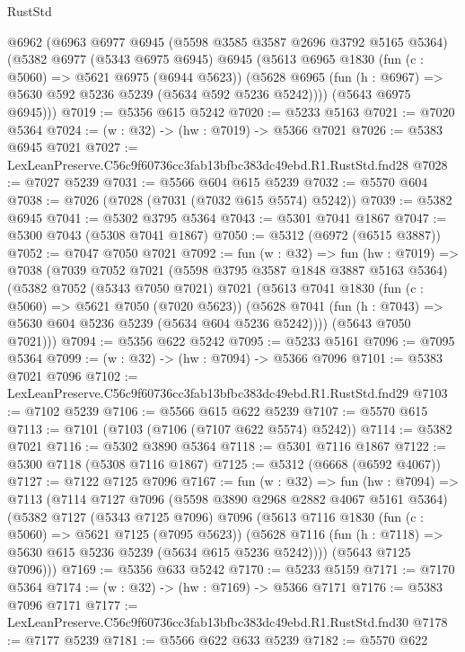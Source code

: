 \begin{lexlean}{RustStd}
\begin{coremodule}
  @6962
    (@6963
      @6977
      @6945
      (@5598 @3585 @3587 @2696 @3792 @5165 @5364)
      (@5382
        @6977
        (@5343 @6975 @6945)
        @6945
        (@5613
          @6965
          @1830
          (fun (c : @5060) => @5621 @6975 (@6944 @5623))
          (@5628 @6965 (fun (h : @6967) => @5630 @592 @5236 @5239 (@5634 @592 @5236 @5242))))
        (@5643 @6975 @6945)))
@7019 := @5356 @615 @5242
@7020 := @5233 @5163
@7021 := @7020 @5364
@7024 := (w : @32) -> (hw : @7019) -> @5366 @7021
@7026 := @5383 @6945 @7021
@7027 := LexLeanPreserve.C56c9f60736cc3fab13bfbc383dc49ebd.R1.RustStd.fnd28
@7028 := @7027 @5239
@7031 := @5566 @604 @615 @5239
@7032 := @5570 @604
@7038 := @7026 (@7028 (@7031 (@7032 @615 @5574) @5242))
@7039 := @5382 @6945
@7041 := @5302 @3795 @5364
@7043 := @5301 @7041 @1867
@7047 := @5300 @7043 (@5308 @7041 @1867)
@7050 := @5312 (@6972 (@6515 @3887))
@7052 := @7047 @7050 @7021
@7092 := fun (w : @32) =>
  fun (hw : @7019) =>
  @7038
    (@7039
      @7052
      @7021
      (@5598 @3795 @3587 @1848 @3887 @5163 @5364)
      (@5382
        @7052
        (@5343 @7050 @7021)
        @7021
        (@5613
          @7041
          @1830
          (fun (c : @5060) => @5621 @7050 (@7020 @5623))
          (@5628 @7041 (fun (h : @7043) => @5630 @604 @5236 @5239 (@5634 @604 @5236 @5242))))
        (@5643 @7050 @7021)))
@7094 := @5356 @622 @5242
@7095 := @5233 @5161
@7096 := @7095 @5364
@7099 := (w : @32) -> (hw : @7094) -> @5366 @7096
@7101 := @5383 @7021 @7096
@7102 := LexLeanPreserve.C56c9f60736cc3fab13bfbc383dc49ebd.R1.RustStd.fnd29
@7103 := @7102 @5239
@7106 := @5566 @615 @622 @5239
@7107 := @5570 @615
@7113 := @7101 (@7103 (@7106 (@7107 @622 @5574) @5242))
@7114 := @5382 @7021
@7116 := @5302 @3890 @5364
@7118 := @5301 @7116 @1867
@7122 := @5300 @7118 (@5308 @7116 @1867)
@7125 := @5312 (@6668 (@6592 @4067))
@7127 := @7122 @7125 @7096
@7167 := fun (w : @32) =>
  fun (hw : @7094) =>
  @7113
    (@7114
      @7127
      @7096
      (@5598 @3890 @2968 @2882 @4067 @5161 @5364)
      (@5382
        @7127
        (@5343 @7125 @7096)
        @7096
        (@5613
          @7116
          @1830
          (fun (c : @5060) => @5621 @7125 (@7095 @5623))
          (@5628 @7116 (fun (h : @7118) => @5630 @615 @5236 @5239 (@5634 @615 @5236 @5242))))
        (@5643 @7125 @7096)))
@7169 := @5356 @633 @5242
@7170 := @5233 @5159
@7171 := @7170 @5364
@7174 := (w : @32) -> (hw : @7169) -> @5366 @7171
@7176 := @5383 @7096 @7171
@7177 := LexLeanPreserve.C56c9f60736cc3fab13bfbc383dc49ebd.R1.RustStd.fnd30
@7178 := @7177 @5239
@7181 := @5566 @622 @633 @5239
@7182 := @5570 @622

\end{coremodule}
\end{lexlean}
